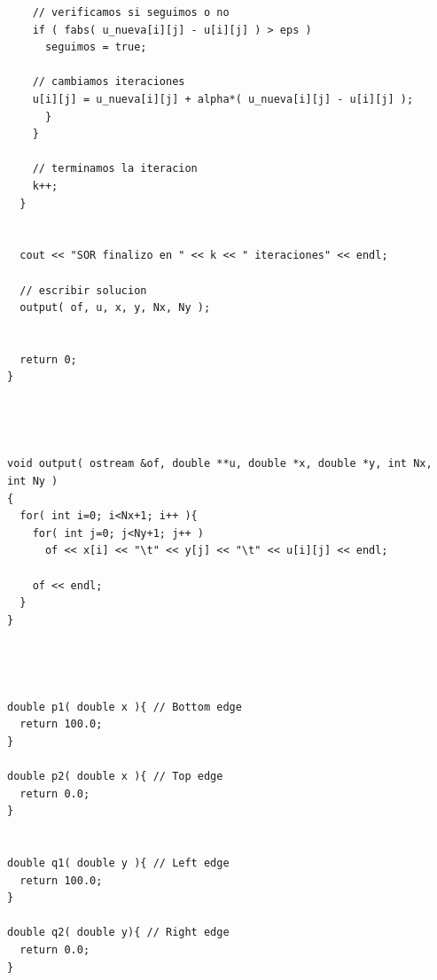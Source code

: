 \begin{lstlisting}
	// verificamos si seguimos o no
	if ( fabs( u_nueva[i][j] - u[i][j] ) > eps )
	  seguimos = true;

	// cambiamos iteraciones
	u[i][j] = u_nueva[i][j] + alpha*( u_nueva[i][j] - u[i][j] );
      }
    }

    // terminamos la iteracion
    k++;
  }


  cout << "SOR finalizo en " << k << " iteraciones" << endl;

  // escribir solucion
  output( of, u, x, y, Nx, Ny );


  return 0;
}




void output( ostream &of, double **u, double *x, double *y, int Nx, int Ny )
{
  for( int i=0; i<Nx+1; i++ ){
    for( int j=0; j<Ny+1; j++ )
      of << x[i] << "\t" << y[j] << "\t" << u[i][j] << endl;

    of << endl;
  }
}




double p1( double x ){ // Bottom edge
  return 100.0;
}

double p2( double x ){ // Top edge
  return 0.0;
}


double q1( double y ){ // Left edge
  return 100.0;
}

double q2( double y){ // Right edge
  return 0.0;
}
\end{lstlisting}

























